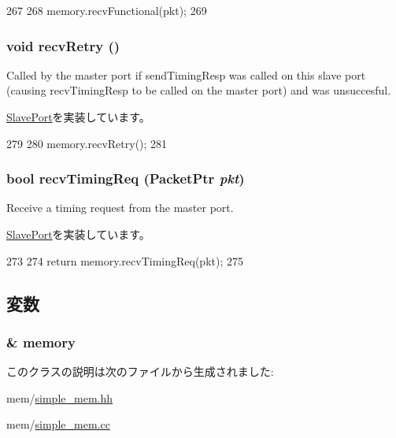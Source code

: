 \begin{DoxyCode}
267 {
268     memory.recvFunctional(pkt);
269 }
\end{DoxyCode}
\hypertarget{classSimpleMemory_1_1MemoryPort_a29cb5a4f98063ce6e9210eacbdb35298}{
\subsubsection[{recvRetry}]{\setlength{\rightskip}{0pt plus 5cm}void recvRetry ()}}
\label{classSimpleMemory_1_1MemoryPort_a29cb5a4f98063ce6e9210eacbdb35298}
Called by the master port if sendTimingResp was called on this slave port (causing recvTimingResp to be called on the master port) and was unsuccesful. 

\hyperlink{classSlavePort_ac1ccc3bcf7ebabb20b57fab99b2be5b0}{SlavePort}を実装しています。


\begin{DoxyCode}
279 {
280     memory.recvRetry();
281 }
\end{DoxyCode}
\hypertarget{classSimpleMemory_1_1MemoryPort_a3344d9dd0f83257feab5424e761f31c6}{
\subsubsection[{recvTimingReq}]{\setlength{\rightskip}{0pt plus 5cm}bool recvTimingReq ({\bf PacketPtr} {\em pkt})}}
\label{classSimpleMemory_1_1MemoryPort_a3344d9dd0f83257feab5424e761f31c6}
Receive a timing request from the master port. 

\hyperlink{classSlavePort_abcece77e42f88ee41af8d3d01bb48253}{SlavePort}を実装しています。


\begin{DoxyCode}
273 {
274     return memory.recvTimingReq(pkt);
275 }
\end{DoxyCode}


\subsection{変数}
\hypertarget{classSimpleMemory_1_1MemoryPort_a491d0d7a4dc46129e8f4dbe03d916ccf}{
\subsubsection[{memory}]{\& {\bf memory}}}
\label{classSimpleMemory_1_1MemoryPort_a491d0d7a4dc46129e8f4dbe03d916ccf}


このクラスの説明は次のファイルから生成されました:\begin{DoxyCompactItemize}
\item 
mem/\hyperlink{simple__mem_8hh}{simple\_\-mem.hh}\item 
mem/\hyperlink{simple__mem_8cc}{simple\_\-mem.cc}\end{DoxyCompactItemize}

